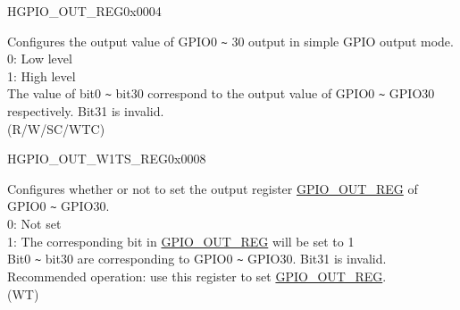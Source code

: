 

\begin{register}{H}{GPIO\_OUT\_REG}{0x0004}\label{regdesc:GPIOOUTREG}
%
\regnewline%
\begin{regdesc}\begin{reglist}
\label{fielddesc:GPIOOUTDATAORIG}\item [GPIO\_OUT\_DATA\_ORIG] Configures the output value of GPIO0 \verb+~+ 30 output in simple GPIO output mode.\\
0: Low level\\
1: High level\\
The value of bit0 \verb+~+ bit30 correspond to the output value of GPIO0 \verb+~+ GPIO30 respectively. Bit31 is invalid.\\
(R/W/SC/WTC)
\end{reglist}\end{regdesc}
\end{register}


\begin{register}{H}{GPIO\_OUT\_W1TS\_REG}{0x0008}\label{regdesc:GPIOOUTW1TSREG}
%
\regnewline%
\begin{regdesc}\begin{reglist}
\label{fielddesc:GPIOOUTW1TS}\item [GPIO\_OUT\_W1TS] Configures whether or not to set the output register \hyperref[regdesc:GPIOOUTREG]{GPIO\_OUT\_REG} of GPIO0 \verb+~+ GPIO30.\\
0: Not set\\
1: The corresponding bit in \hyperref[regdesc:GPIOOUTREG]{GPIO\_OUT\_REG} will be set to 1\\
Bit0 \verb+~+ bit30 are corresponding to GPIO0 \verb+~+ GPIO30. Bit31 is invalid.
Recommended operation: use this register to set \hyperref[regdesc:GPIOOUTREG]{GPIO\_OUT\_REG}. \\
(WT)
\end{reglist}\end{regdesc}
\end{register}


